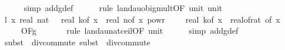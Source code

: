 \begin{isabellebody}
\ \ \ \ \isamarkupfalse%
\ {\isacharparenleft}{\kern0pt}simp\ add{\isacharcolon}{\kern0pt}g{\isacharunderscore}{\kern0pt}def{\isacharparenright}{\kern0pt}\isanewline
\ \ \ \ \isamarkupfalse%
\ {\isacharparenleft}{\kern0pt}rule\ landau{\isacharunderscore}{\kern0pt}o{\isachardot}{\kern0pt}big{\isacharunderscore}{\kern0pt}mult{\isacharunderscore}{\kern0pt}{}{\isacharbrackleft}{\kern0pt}OF\ unit{\isacharunderscore}{\kern0pt}{}\ unit{\isacharunderscore}{\kern0pt}{}{\isacharbrackright}{\kern0pt}{\isacharparenright}{\kern0pt}\isanewline
\isanewline
\ \ \isamarkupfalse%
\ l{}{\isacharcolon}{\kern0pt}\ {\isachardoublequoteopen}{\isacharparenleft}{\kern0pt}{\isasymlambda}x{\isachardot}{\kern0pt}\ real\ {\isacharparenleft}{\kern0pt}nat\ {\isasymlceil}{}\ {\isacharasterisk}{\kern0pt}\ real\ {\isacharparenleft}{\kern0pt}k{\isacharunderscore}{\kern0pt}of\ x{\isacharparenright}{\kern0pt}\ {\isacharasterisk}{\kern0pt}\ real\ {\isacharparenleft}{\kern0pt}n{\isacharunderscore}{\kern0pt}of\ x{\isacharparenright}{\kern0pt}\ powr\ {\isacharparenleft}{\kern0pt}{}\ {\isacharminus}{\kern0pt}\ {}\ {\isacharslash}{\kern0pt}\ real\ {\isacharparenleft}{\kern0pt}k{\isacharunderscore}{\kern0pt}of\ x{\isacharparenright}{\kern0pt}{\isacharparenright}{\kern0pt}\ {\isacharslash}{\kern0pt}\ {\isacharparenleft}{\kern0pt}real{\isacharunderscore}{\kern0pt}of{\isacharunderscore}{\kern0pt}rat\ {\isacharparenleft}{\kern0pt}{\isasymdelta}{\isacharunderscore}{\kern0pt}of\ x{\isacharparenright}{\kern0pt}{\isacharparenright}{\kern0pt}\isanewline
\ \ \ \ {\isasymin}\ O{\isacharbrackleft}{\kern0pt}{\isacharquery}{\kern0pt}F{\isacharbrackright}{\kern0pt}{\isacharparenleft}{\kern0pt}g{}{\isacharparenright}{\kern0pt}{\isachardoublequoteclose}\ \isanewline
\ \ \ \ \isamarkupfalse%
\ {\isacharparenleft}{\kern0pt}rule\ landau{\isacharunderscore}{\kern0pt}nat{\isacharunderscore}{\kern0pt}ceil{\isacharbrackleft}{\kern0pt}OF\ unit{\isacharunderscore}{\kern0pt}{}{\isacharbrackright}{\kern0pt}{\isacharparenright}{\kern0pt}\isanewline
\ \ \ \ \isamarkupfalse%
\ {\isacharparenleft}{\kern0pt}simp\ add{\isacharcolon}{\kern0pt}g{}{\isacharunderscore}{\kern0pt}def{\isacharparenright}{\kern0pt}\isanewline
\ \ \ \ \isamarkupfalse%
\ {\isacharparenleft}{\kern0pt}subst\ {\isacharparenleft}{\kern0pt}{}{\isacharparenright}{\kern0pt}\ div{\isacharunderscore}{\kern0pt}commute{\isacharcomma}{\kern0pt}\ subst\ {\isacharparenleft}{\kern0pt}{}{\isacharparenright}{\kern0pt}\ div{\isacharunderscore}{\kern0pt}commute{\isacharparenright}{\kern0pt}\isanewline

\end{isabellebody}
